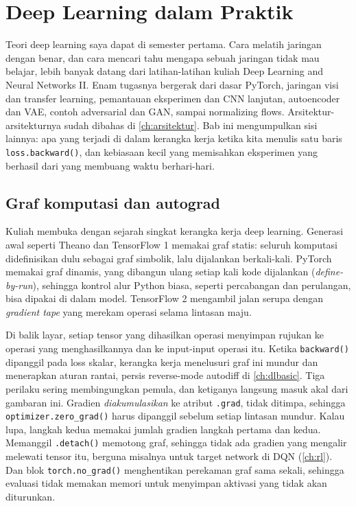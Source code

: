 \chapter{Deep Learning dalam Praktik}
\label{ch:praktik}

Teori deep learning saya dapat di semester pertama. Cara melatih jaringan dengan benar, dan cara mencari tahu mengapa
sebuah jaringan tidak mau belajar, lebih banyak datang dari latihan-latihan kuliah Deep Learning and Neural Networks II.
Enam tugasnya bergerak dari dasar PyTorch, jaringan visi dan transfer learning, pemantauan
eksperimen dan CNN lanjutan, autoencoder dan VAE, contoh adversarial dan GAN, sampai normalizing flows. Arsitektur-arsitekturnya
sudah dibahas di \cref{ch:arsitektur}. Bab ini mengumpulkan sisi lainnya: apa yang terjadi di dalam kerangka kerja ketika kita
menulis satu baris \texttt{loss.backward()}, dan kebiasaan kecil yang memisahkan eksperimen yang berhasil dari yang membuang
waktu berhari-hari.

\section{Graf komputasi dan autograd}

Kuliah membuka dengan sejarah singkat kerangka kerja deep learning. Generasi awal seperti Theano dan TensorFlow 1 memakai graf
statis: seluruh komputasi didefinisikan dulu sebagai graf simbolik, lalu dijalankan berkali-kali. PyTorch \citep{paszke2019}
memakai graf dinamis, yang dibangun ulang setiap kali kode dijalankan (\emph{define-by-run}), sehingga kontrol alur Python biasa,
seperti percabangan dan perulangan, bisa dipakai di dalam model. TensorFlow 2 mengambil jalan serupa dengan \emph{gradient tape}
yang merekam operasi selama lintasan maju.

Di balik layar, setiap tensor yang dihasilkan operasi menyimpan rujukan ke operasi yang menghasilkannya dan ke input-input
operasi itu. Ketika \texttt{backward()} dipanggil pada loss skalar, kerangka kerja menelusuri graf ini mundur dan menerapkan
aturan rantai, persis reverse-mode autodiff di \cref{ch:dlbasic}. Tiga perilaku sering membingungkan pemula, dan ketiganya
langsung masuk akal dari gambaran ini. Gradien \emph{diakumulasikan} ke atribut \texttt{.grad}, tidak ditimpa, sehingga
\texttt{optimizer.zero\_grad()} harus dipanggil sebelum setiap lintasan mundur. Kalau lupa, langkah kedua memakai jumlah gradien
langkah pertama dan kedua. Memanggil \texttt{.detach()} memotong graf, sehingga tidak ada gradien yang mengalir melewati tensor
itu, berguna misalnya untuk target network di DQN (\cref{ch:rl}). Dan blok \texttt{torch.no\_grad()} menghentikan perekaman graf
sama sekali, sehingga evaluasi tidak memakan memori untuk menyimpan aktivasi yang tidak akan diturunkan.

